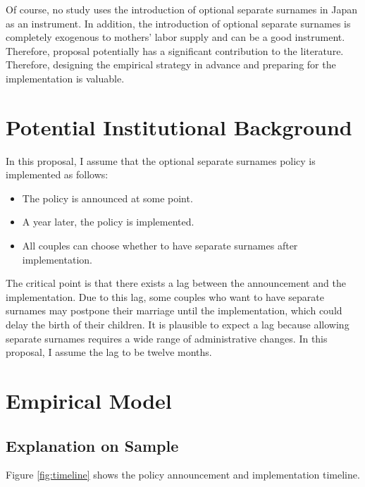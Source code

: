 \documentclass[12pt]{article}
\begin{document}
Of course, no study uses the introduction of optional separate surnames in Japan as an instrument.
In addition, the introduction of optional separate surnames is completely exogenous to mothers' labor supply and can be a good instrument.
Therefore, proposal potentially has a significant contribution to the literature.
Therefore, designing the empirical strategy in advance and preparing for the implementation is valuable.


\section{Potential Institutional Background}
In this proposal, I assume that the optional separate surnames policy is implemented as follows: 
\begin{itemize}
  \item The policy is announced at some point. 
  \item A year later, the policy is implemented.
  \item All couples can choose whether to have separate surnames after implementation.
\end{itemize}
The critical point is that there exists a lag between the announcement and the implementation.
Due to this lag, some couples who want to have separate surnames may postpone their marriage until the implementation, which could delay the birth of their children.
It is plausible to expect a lag because allowing separate surnames requires a wide range of administrative changes.
In this proposal, I assume the lag to be twelve months.

\section{Empirical Model}
\subsection*{Explanation on Sample}
Figure \ref{fig:timeline} shows the policy announcement and implementation timeline.
\end{document}
